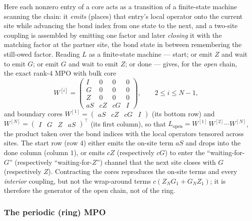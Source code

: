\documentclass[12pt]{article}
\theoremstyle{definition}
\theoremstyle{remark}
\begin{document}
Here each nonzero entry of a core acts as a transition of a finite-state machine scanning the chain: it \emph{emits} (places) that entry's local operator onto the current site while advancing the bond index from one state to the next, and a two-site coupling is assembled by emitting one factor and later \emph{closing} it with the matching factor at the partner site, the bond state in between remembering the still-owed factor. Reading $L$ as a finite-state machine --- start; or emit $Z$ and wait to emit $G$; or emit $G$ and wait to emit $Z$; or done --- gives, for the \emph{open} chain, the exact rank-$4$ MPO with bulk core
\[
W^{[i]} =
\begin{pmatrix}
I  & 0   & 0   & 0 \\
G  & 0   & 0   & 0 \\
Z  & 0   & 0   & 0 \\
aS & cZ  & cG  & I
\end{pmatrix},
\qquad 2 \le i \le N-1,
\]
and boundary cores $W^{[1]} = \begin{pmatrix} aS & cZ & cG & I \end{pmatrix}$ (its bottom row) and $W^{[N]} = \begin{pmatrix} I & G & Z & aS \end{pmatrix}^{\!\top}$ (its first column), so that $L_{\mathrm{open}} = W^{[1]}\,W^{[2]} \cdots W^{[N]}$, the product taken over the bond indices with the local operators tensored across sites. The start row (row $4$) either emits the on-site term $aS$ and drops into the done column (column $1$), or emits $cZ$ (respectively $cG$) to enter the ``waiting-for-$G$'' (respectively ``waiting-for-$Z$'') channel that the next site closes with $G$ (respectively $Z$). Contracting the cores reproduces the on-site terms and every \emph{interior} coupling, but not the wrap-around terms $c(Z_N G_1 + G_N Z_1)$; it is therefore the generator of the open chain, not of the ring.

\subsubsection{The periodic (ring) MPO}
\end{document}
